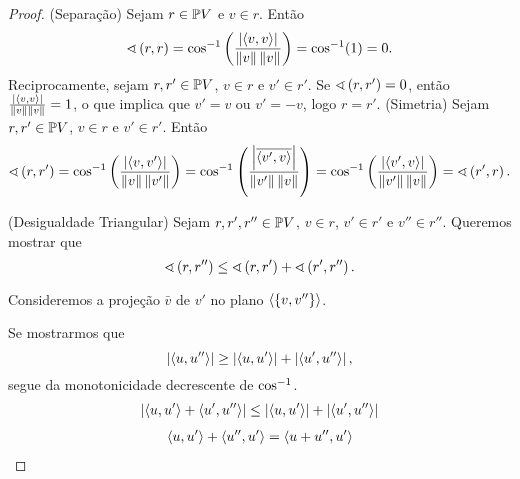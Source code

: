 \begin{proof}
\begin{comment}
\end{comment}
(Separação) Sejam $r \in \pro V$ e $v \in r$. Então
	\begin{equation*}
	\ang{r}{r} = \cos\inv \left( \frac{\abs{\inte{v}{v}}}{\nor{v}\nor{v}} \right) = \cos\inv (1) = 0.
	\end{equation*}
Reciprocamente, sejam $r,r' \in \pro V$, $v \in r$ e $v' \in r'$. Se $\ang{r}{r'} = 0$, então $\frac{\abs{\inte{v}{v}}}{\nor{v}\nor{v}}= 1$, o que implica que $v'=v$ ou $v'=-v$, logo $r=r'$.
(Simetria) Sejam $r,r' \in \pro V$, $v \in r$ e $v' \in r'$. Então
	\begin{equation*}
	\ang{r}{r'} = \cos\inv \left( \frac{\abs{\inte{v}{v'}}}{\nor{v}\nor{v'}} \right) = \cos\inv \left( \frac{\abs{\conju{\inte{v'}{v}}}}{\nor{v'}\nor{v}} \right) = \cos\inv \left( \frac{\abs{\inte{v'}{v}}}{\nor{v'}\nor{v}} \right) = \ang{r'}{r}.
	\end{equation*}

(Desigualdade Triangular) Sejam $r,r',r'' \in \pro V$, $v \in r$, $v' \in r'$ e $v'' \in r''$. Queremos mostrar que
	\begin{equation*}
	\ang{r}{r''} \leq \ang{r}{r'} + \ang{r'}{r''}.
	\end{equation*}
%

Consideremos a projeção $\bar v$ de $v'$ no plano $\ger{\{v,v''\}}$. 	

Se mostrarmos que
	\begin{equation*}
	\abs{\inte{u}{u''}} \geq \abs{\inte{u}{u'}} + \abs{\inte{u'}{u''}},
	\end{equation*}
segue da monotonicidade decrescente de $\cos\inv$.
	\begin{align*}
	\abs{\inte{u}{u'}+\inte{u'}{u''}} \leq \abs{\inte{u}{u'}} + \abs{\inte{u'}{u''}}
	\end{align*}
	\begin{align*}
	\inte{u}{u'}+\inte{u''}{u'} = \inte{u+u''}{u'}
	\end{align*}
\end{proof}

